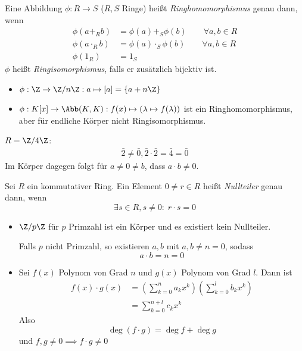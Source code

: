 \documentclass{mycourse}
\begin{document}
\begin{df}
\label{df:10.9}
Eine Abbildung $\phi:R\to S$ ($R, S$ Ringe) heißt \emph{Ringhomomorphismus} genau dann, wenn
\begin{align*}
\phi(a+_R b) &= \phi(a) +_S \phi(b) \qquad \forall a,b\in R\\
\phi(a \cdot_R b) &= \phi(a) \cdot_S \phi(b) \qquad \forall a,b\in R \\
\phi(1_R)&= 1_S
\end{align*}
$\phi$ heißt \emph{Ringisomorphismus}, falls er zusätzlich bijektiv ist.
\end{df}

\begin{ex}
\begin{itemize}
\item $\phi:\Z\to \Z/n\Z:a\mapsto [a]=\{a+n\Z\}$
\item $\phi: K[x]\to \Abb(K,K):f(x)\mapsto (\lambda\mapsto f(\lambda))$ ist ein Ringhomomorphismus, aber für endliche Körper nicht Ringisomorphismus.
\end{itemize}
\end{ex}

$R=\Z/4\Z$:
\begin{align*}
\bar2\neq \bar0, \bar2\cdot \bar2=\bar4=\bar0
\end{align*}
Im Körper dagegen folgt für $a\neq 0\neq b$, dass $a\cdot b\neq 0$.

\begin{df}
\label{df:10.10}
Sei $R$ ein kommutativer Ring.
Ein Element $0\neq r\in R$ heißt \emph{Nullteiler} genau dann, wenn
\[
\exists s\in R, s\neq 0:\; r\cdot s=0
\]
\end{df}

\begin{ex}
\begin{itemize}
\item
$\Z/p\Z$ für $p$ Primzahl ist ein Körper und es existiert kein Nullteiler.

Falls $p$ nicht Primzahl, so existieren $a,b$ mit $a,b\neq n=0$, sodass
\[
a\cdot b=n=0
\]
\item
Sei $f(x)$ Polynom von Grad $n$ und $g(x)$ Polynom von Grad $l$.
Dann ist
\begin{align*}
f(x)\cdot g(x) &= \left(\sum_{k=0}^na_kx^k\right)\left(\sum_{k=0}^lb_kx^k\right) \\
&=\sum_{k=0}^{n+l}c_kx^k
\end{align*}
Also
\[
\deg(f\cdot g)=\deg f +\deg g
\]
und $f,g\neq 0 \implies f\cdot g\neq 0$
\end{itemize}
\end{ex}
\end{document}
